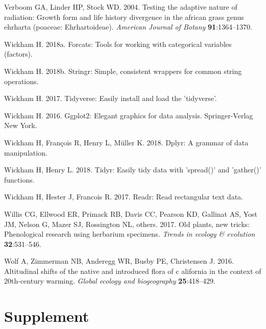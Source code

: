 \documentclass[man,floatsintext]{apa6}
\theoremstyle{definition}
\theoremstyle{definition}
\theoremstyle{definition}
\theoremstyle{remark}
\begin{document}
\leavevmode\hypertarget{ref-verboom2004testing}{}%
Verboom GA, Linder HP, Stock WD. 2004. Testing the adaptive nature of
radiation: Growth form and life history divergence in the african grass
genus ehrharta (poaceae: Ehrhartoideae). \emph{American Journal of
Botany} \textbf{91}:1364--1370.

\leavevmode\hypertarget{ref-R-forcats}{}%
Wickham H. 2018a. Forcats: Tools for working with categorical variables
(factors).

\leavevmode\hypertarget{ref-R-stringr}{}%
Wickham H. 2018b. Stringr: Simple, consistent wrappers for common string
operations.

\leavevmode\hypertarget{ref-R-tidyverse}{}%
Wickham H. 2017. Tidyverse: Easily install and load the 'tidyverse'.

\leavevmode\hypertarget{ref-R-ggplot2}{}%
Wickham H. 2016. Ggplot2: Elegant graphics for data analysis.
Springer-Verlag New York.

\leavevmode\hypertarget{ref-R-dplyr}{}%
Wickham H, François R, Henry L, Müller K. 2018. Dplyr: A grammar of data
manipulation.

\leavevmode\hypertarget{ref-R-tidyr}{}%
Wickham H, Henry L. 2018. Tidyr: Easily tidy data with 'spread()' and
'gather()' functions.

\leavevmode\hypertarget{ref-R-readr}{}%
Wickham H, Hester J, Francois R. 2017. Readr: Read rectangular text
data.

\leavevmode\hypertarget{ref-willis2017old}{}%
Willis CG, Ellwood ER, Primack RB, Davis CC, Pearson KD, Gallinat AS,
Yost JM, Nelson G, Mazer SJ, Rossington NL, others. 2017. Old plants,
new tricks: Phenological research using herbarium specimens.
\emph{Trends in ecology \& evolution} \textbf{32}:531--546.

\leavevmode\hypertarget{ref-wolf2016altitudinal}{}%
Wolf A, Zimmerman NB, Anderegg WR, Busby PE, Christensen J. 2016.
Altitudinal shifts of the native and introduced flora of c alifornia in
the context of 20th-century warming. \emph{Global ecology and
biogeography} \textbf{25}:418--429.

\endgroup

\newpage
\setcounter{table}{0}  \renewcommand{\thetable}{S\arabic{table}} \setcounter{figure}{0} \renewcommand{\thefigure}{S\arabic{figure}}

\hypertarget{supplement}{%
\section{Supplement}\label{supplement}}
\end{document}
